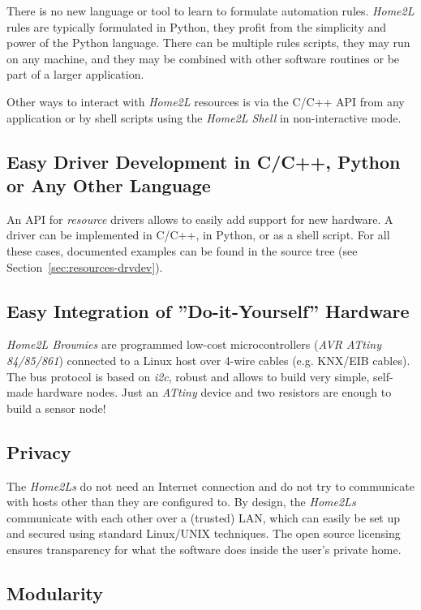 \documentclass[12pt,english,parskip=half,headheight=19pt]{scrreprt}
\begin{document}
There is no new language or tool to learn to formulate automation rules.
\textit{Home2L} rules are typically formulated in Python, they profit from the
simplicity and power of the Python language.
There can be multiple rules scripts, they may run on any machine, and they may
be combined with other software routines or be part of a larger application.

Other ways to interact with \textit{Home2L} resources is via the C/C++ API from any
application or by shell scripts using the \textit{Home2L Shell} in non-interactive mode.


\subsection*{Easy Driver Development in C/C++, Python or Any Other Language}

An API for \textit{resource} drivers allows to easily add support for new hardware.
A driver can be implemented in C/C++, in Python, or as a shell script.
For all these cases, documented examples can be found in the source tree
(see Section~\ref{sec:resources-drvdev}).


\subsection*{Easy Integration of ''Do-it-Yourself'' Hardware}

\textit{Home2L Brownies} are programmed low-cost microcontrollers (\textit{AVR ATtiny 84/85/861}) connected to a Linux host over 4-wire cables (e.g. KNX/EIB cables). The bus protocol is based on \textit{i2c}, robust and allows to build very simple, self-made hardware nodes. Just an \textit{ATtiny} device and two resistors are enough to build a sensor node!


\subsection*{Privacy}

The \textit{Home2Ls} do not need an Internet connection and do not try to communicate
with hosts other than they are configured to. By design, the \textit{Home2Ls}
communicate with each other over a (trusted) LAN, which can easily be set up
and secured using standard Linux/UNIX techniques. The open source licensing ensures
transparency for what the software does inside the user's private home.


\subsection*{Modularity}
\end{document}
